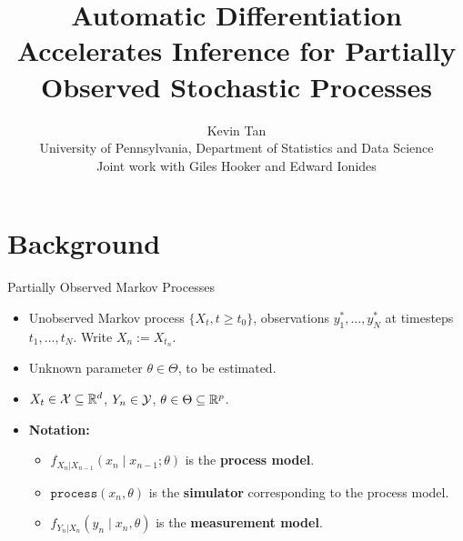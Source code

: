 \documentclass{beamer}
\title[AD for POMPs]{Automatic Differentiation Accelerates Inference for Partially Observed Stochastic Processes}
\author[Kevin Tan]{Kevin Tan \\ \small{University of Pennsylvania, Department of Statistics and Data Science} \\\vspace{0.5cm} \small{Joint work with Giles Hooker and Edward Ionides}}
\begin{document}
\maketitle


\section{Background}


\begin{frame}{Partially Observed Markov Processes}

    \begin{itemize}
        \item Unobserved Markov process $\{X_t, t \geq t_0\}$, observations $y_1^*,...,y_N^*$ at timesteps $t_1,..., t_N$. Write $X_n := X_{t_n}$.
        \item \pause Unknown parameter $\theta \in \Theta$, to be estimated.
        \item $X_t \in {\mathcal{X}} \subseteq \mathbb{R}^d$, $Y_n \in {\mathcal{Y}}$, $\theta \in \Theta \subseteq \mathbb{R}^p$.\pause
        \item \textbf{Notation:}
        \begin{itemize}
            \item $f_{X_n|X_{n-1}}\left(x_{n} \mid x_{n-1}; \theta\right)$ is the \textbf{process model}.
            \item \pause $\texttt{process}\left(x_n, \theta\right)$ is the \textbf{simulator} corresponding to the process model. 
            \item \pause $f_{Y_n|X_n}\left(y_n \mid x_n, \theta\right)$ is the \textbf{measurement model}.
        \end{itemize}
    \end{itemize}
\end{frame}
\end{document}
